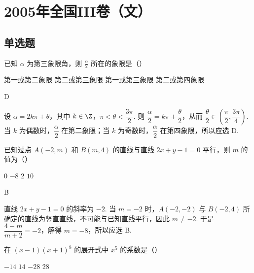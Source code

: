 \chapter{2005年全国III卷（文）}
\section{单选题}
\begin{problem}
已知 \(\alpha\) 为第三象限角，则 \(\frac{\alpha}{2}\) 所在的象限是（\quad）

\choices
    {第一或第二象限}
    {第二或第三象限}
    {第一或第三象限}
    {第二或第四象限}
\end{problem}

\begin{answer}
D
\end{answer}

\begin{solution}
设 \(\alpha=2k\pi+\theta\)，其中 \(k\in\Z\)，\(\pi<\theta<\dfrac{3\pi}{2}\). 则
\(\dfrac{\alpha}{2}=k\pi+\dfrac{\theta}{2}\)，从而 \(\dfrac{\theta}{2}\in\left(\dfrac{\pi}{2},\dfrac{3\pi}{4}\right)\). 当 \(k\) 为偶数时，\(\dfrac{\alpha}{2}\) 在第二象限；当 \(k\) 为奇数时，\(\dfrac{\alpha}{2}\) 在第四象限，所以应选 D.
\end{solution}



\begin{problem}
已知过点 \(A(-2, m)\) 和 \(B(m, 4)\) 的直线与直线 \(2x + y - 1 = 0\) 平行，则 \(m\) 的值为（\quad）

\choices
    {\(0\)}
    {\(-8\)}
    {\(2\)}
    {\(10\)}
\end{problem}

\begin{answer}
B
\end{answer}

\begin{solution}
直线 \(2x+y-1=0\) 的斜率为 \(-2\). 当 \(m=-2\) 时，\(A(-2,-2)\) 与 \(B(-2,4)\) 所确定的直线为竖直直线，不可能与已知直线平行，因此 \(m\ne-2\). 于是
\(\dfrac{4-m}{m+2}=-2\)，解得 \(m=-8\)，所以应选 B.
\end{solution}



\begin{problem}
在 \((x - 1)(x + 1)^8\) 的展开式中 \(x^5\) 的系数是（\quad）

\choices
    {\(-14\)}
    {\(14\)}
    {\(-28\)}
    {\(28\)}
\end{problem}

